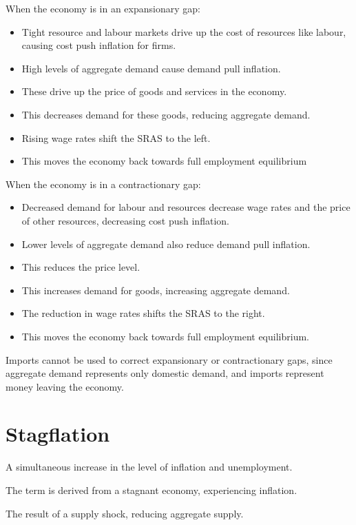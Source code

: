 \documentclass[a4paper,11pt]{article}
\begin{document}
When the economy is in an expansionary gap:

\begin{itemize}
\item Tight resource and labour markets drive up the cost of resources like
	labour, causing cost push inflation for firms.
\item High levels of aggregate demand cause demand pull inflation.
\item These drive up the price of goods and services in the economy.
\item This decreases demand for these goods, reducing aggregate demand.
\item Rising wage rates shift the SRAS to the left.
\item This moves the economy back towards full employment equilibrium
\end{itemize}

When the economy is in a contractionary gap:

\begin{itemize}
\item Decreased demand for labour and resources decrease wage rates and the
	price of other resources, decreasing cost push inflation.
\item Lower levels of aggregate demand also reduce demand pull inflation.
\item This reduces the price level.
\item This increases demand for goods, increasing aggregate demand.
\item The reduction in wage rates shifts the SRAS to the right.
\item This moves the economy back towards full employment equilibrium.
\end{itemize}

Imports cannot be used to correct expansionary or contractionary gaps, since
aggregate demand represents only domestic demand, and imports represent money
leaving the economy.




\section{Stagflation}

A simultaneous increase in the level of inflation and unemployment.

The term is derived from a stagnant economy, experiencing inflation.

The result of a supply shock, reducing aggregate supply.
\end{document}
